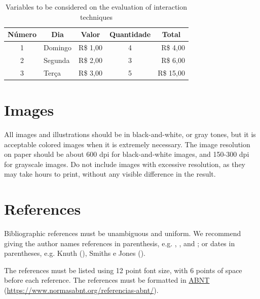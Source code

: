 \documentclass[12pt]{article}
\begin{document}
\begin{table}[ht]
\centering
\caption{Variables to be considered on the evaluation of interaction
  techniques}
\label{tab:exTable1}
\begin{tabular}{clrcr}
\hline
\textbf{Número} & \multicolumn{1}{c}{\textbf{Dia}}     & \multicolumn{1}{c}{\textbf{Valor}}  & \textbf{Quantidade} & \multicolumn{1}{c}{\textbf{Total}}     \\ \hline
1      & Domingo & R\$ 1,00 & 4          & R\$ 4,00  \\
2      & Segunda & R\$ 2,00 & 3          & R\$ 6,00  \\ 
3      & Terça   & R\$ 3,00 & 5          & R\$ 15,00 \\ \hline
\end{tabular}
\end{table}

\section{Images}

All images and illustrations should be in black-and-white, or gray tones, but it is acceptable colored images when it is extremely necessary. The image resolution on paper should be about 600 dpi for black-and-white images, and 150-300 dpi for grayscale images.  Do not include
images with excessive resolution, as they may take hours to print, without any
visible difference in the result.

\section{References}

Bibliographic references must be unambiguous and uniform. We recommend giving
the author names references in parenthesis, e.g. \cite{knuth:84},
\cite{boulic:91}, and \cite{smith:99}; or dates in parentheses, e.g. Knuth (\citeyear{knuth:84}), Smiths e Jones (\citeyear{smith:99}).

The references must be listed using 12 point font size, with 6 points of space
before each reference. The references must be formatted in \href{https://www.normasabnt.org/referencias-abnt/}{ABNT} (\url{https://www.normasabnt.org/referencias-abnt/}).




\end{document}
